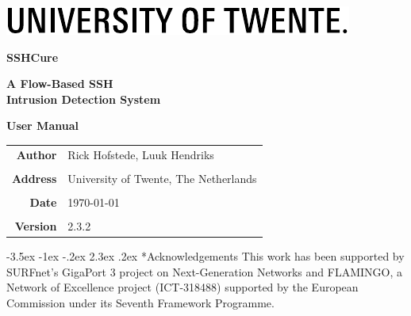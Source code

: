 \documentclass[a4paper,10pt]{article}
\makeatletter
\renewcommand\section{\@startsection {section}{1}{\z@}%
                   {-3.5ex \@plus -1ex \@minus -.2ex}%
                   {2.3ex \@plus.2ex}%
                   {\normalfont\sffamily\Large\bfseries\color{BrickRed}}}
\makeatother
\begin{document}
\pagestyle{empty}
\sffamily\Large

\begin{center}
	\vspace*{1cm} \includegraphics[width=0.7\linewidth]{img/UT_Logo_Black_RGB_EN}

	\vspace{4cm} {\fontsize{60pt}{80pt}\selectfont\bfseries\color{BrickRed} SSHCure}

	\vspace{4cm} {\Huge\bfseries A Flow-Based SSH \\[0.3cm] Intrusion Detection System}

	\vspace{1cm} {\LARGE\bfseries User Manual}
\end{center}

\vspace{3cm}

\begin{tabular}{rl}
	\bfseries Author & Rick Hofstede, Luuk Hendriks \\
	 & \\
	\bfseries Address &  University of Twente, The Netherlands \\
	 & \\
	\bfseries Date & \today \\
	 & \\
	\bfseries Version & 2.3.2
\end{tabular}

\cleardoublepage

\label{pdf_contents}
\pagestyle{fancy}

\normalsize
\tableofcontents

\newpage\cleardoublepage\normalfont

 \newpage
 \newpage
 \newpage




\section*{Acknowledgements}
This work has been supported by SURFnet's GigaPort 3 project on Next-Generation Networks and FLAMINGO, a Network of Excellence 
project (ICT-318488) supported by the European Commission under its Seventh Framework Programme.

\newpage



\label{totalpages}	%
\end{document}
